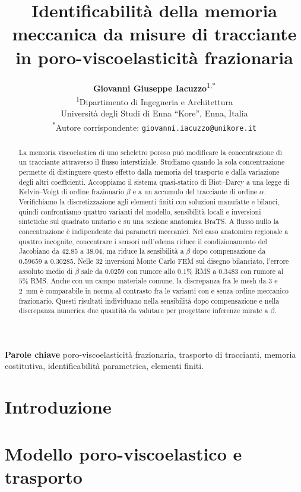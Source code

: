 \documentclass[10pt,a4paper]{article}
\title{\bfseries Identificabilità della memoria meccanica da misure di tracciante in poro-viscoelasticità frazionaria}
\author{
  \textbf{Giovanni Giuseppe Iacuzzo}\textsuperscript{1,*} \\
  \small \textsuperscript{1}Dipartimento di Ingegneria e Architettura \\
  \small Università degli Studi di Enna ``Kore'', Enna, Italia \\
  \small \textsuperscript{*}Autore corrispondente: \texttt{giovanni.iacuzzo@unikore.it}
}
\date{}
\begin{document}
\renewcommand{\figurename}{Figura}\renewcommand{\tablename}{Tabella}
\renewcommand{\abstractname}{Sommario}

\maketitle

\begin{abstract}
La memoria viscoelastica di uno scheletro poroso può modificare la concentrazione di un tracciante attraverso il flusso interstiziale. Studiamo quando la sola concentrazione permette di distinguere questo effetto dalla memoria del trasporto e dalla variazione degli altri coefficienti. Accoppiamo il sistema quasi-statico di Biot--Darcy a una legge di Kelvin--Voigt di ordine frazionario $\beta$ e a un accumulo del tracciante di ordine $\alpha$. Verifichiamo la discretizzazione agli elementi finiti con soluzioni manufatte e bilanci, quindi confrontiamo quattro varianti del modello, sensibilità locali e inversioni sintetiche sul quadrato unitario e su una sezione anatomica BraTS. A flusso nullo la concentrazione è indipendente dai parametri meccanici. Nel caso anatomico regionale a quattro incognite, concentrare i sensori nell'edema riduce il condizionamento del Jacobiano da $42.85$ a $38.04$, ma riduce la sensibilità a $\beta$ dopo compensazione da $0.59659$ a $0.30285$. Nelle 32 inversioni Monte Carlo FEM sul disegno bilanciato, l'errore assoluto medio di $\beta$ sale da $0.0259$ con rumore allo $0.1\%$ RMS a $0.3483$ con rumore al $5\%$ RMS. Anche con un campo materiale comune, la discrepanza fra le mesh da 3 e 2~mm è comparabile in norma al contrasto fra le varianti con e senza ordine meccanico frazionario. Questi risultati individuano nella sensibilità dopo compensazione e nella discrepanza numerica due quantità da valutare per progettare inferenze mirate a $\beta$.
\end{abstract}

\noindent\textbf{Parole chiave}\enspace
poro-viscoelasticità frazionaria, trasporto di traccianti, memoria costitutiva, identificabilità parametrica, elementi finiti.

\section{Introduzione}
\label{sec:introduction}

\FloatBarrier

\section{Modello poro-viscoelastico e trasporto}
\label{sec:forward}

\end{document}
